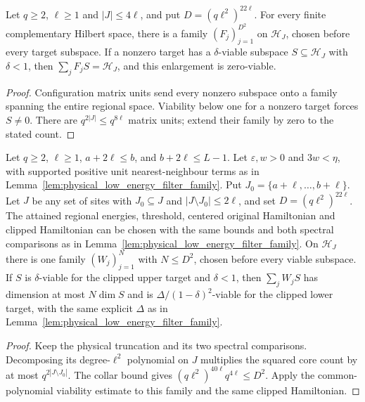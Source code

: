 \begin{lemma}
    \label{lem:short_region_spanning_family}
    \leanok
    Let $q\ge2$, $\ell\ge1$ and $|J|\le4\ell$, and put
    $D=(q\ell^2)^{22\ell}$. For every finite complementary Hilbert
    space, there is a family $(F_j)_{j=1}^{D^2}$ on $\mathcal H_J$,
    chosen before every target subspace. If a nonzero target has a
    $\delta$-viable subspace $S\subseteq\mathcal H_J$ with $\delta<1$,
    then $\sum_jF_jS=\mathcal H_J$, and this enlargement is zero-viable.
\end{lemma}
\begin{proof}
    \leanok
    Configuration matrix units send every nonzero subspace onto a family
    spanning the entire regional space. Viability below one for a nonzero
    target forces $S\ne0$. There are $q^{2|J|}\le q^{8\ell}$ matrix
    units; extend their family by zero to the stated count.
\end{proof}

\begin{lemma}
    \label{lem:low_energy_regional_family}
    \leanok
    Let $q\ge2$, $\ell\ge1$, $a+2\ell\le b$, and
    $b+2\ell\le L-1$. Let $\varepsilon,w>0$ and $3w<\eta$, with
    supported positive unit nearest-neighbour terms as in
    Lemma~\ref{lem:physical_low_energy_filter_family}. Put
    $J_0=\{a+\ell,\ldots,b+\ell\}$. Let $J$ be any set of sites with
    $J_0\subseteq J$ and $|J\setminus J_0|\le2\ell$, and set
    $D=(q\ell^2)^{22\ell}$. The attained regional energies, threshold,
    centered original Hamiltonian and clipped Hamiltonian can be chosen
    with the same bounds and both spectral comparisons as in Lemma~\ref{lem:physical_low_energy_filter_family}.
    On $\mathcal H_J$ there is one family $(W_j)_{j=1}^N$ with $N\le D^2$,
    chosen before every viable subspace. If $S$ is $\delta$-viable for the
    clipped upper target and $\delta<1$, then $\sum_jW_jS$ has dimension
    at most $N\dim S$ and is $\Delta/(1-\delta)^2$-viable for the clipped
    lower target, with the same explicit $\Delta$ as in Lemma~\ref{lem:physical_low_energy_filter_family}.
\end{lemma}
\begin{proof}
    \leanok
    Keep the physical truncation and its two spectral comparisons.
    Decomposing its degree-$\ell^2$ polynomial on $J$ multiplies the
    squared core count by at most $q^{2|J\setminus J_0|}$.
    The collar bound gives
    $(q\ell^2)^{40\ell}q^{4\ell}\le D^2$.
    Apply the common-polynomial viability estimate to this family and
    the same clipped Hamiltonian.
\end{proof}

